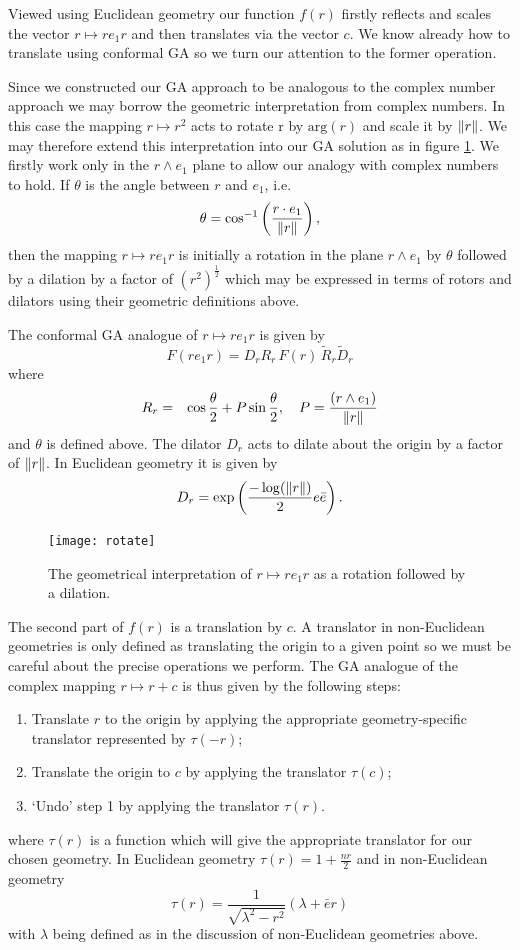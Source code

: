 \begin{enumarate}
Viewed using Euclidean geometry our function $f(r)$ firstly reflects and
scales the vector $r \mapsto re_1r$ and then translates via the vector $c$. We
know already how to translate using conformal GA so we turn our attention to
the former operation.

Since we constructed our GA approach to be analogous to the complex number approach we
may borrow the geometric interpretation from complex numbers. In this case the mapping 
$r \mapsto r^2$ acts to rotate r by $\mathrm{arg}(r)$ and scale it by
$\left\Vert r \right\Vert$. We may therefore extend this interpretation into our GA solution as in
figure \ref{fig:rotate}. We firstly work only in the $r \wedge e_1$ plane to allow
our analogy with complex numbers to hold. If $\theta$ is the angle between $r$ and
$e_1$, i.e.
\[
\theta = \cos^{-1}\left(\frac{r \cdot e_1}{\left\Vert r \right\Vert}\right),
\] 
then the mapping $r \mapsto re_1r$ is initially a rotation in the plane $r \wedge e_1$
by $\theta$ followed by a dilation by a factor of $(r^2)^\frac{1}{2}$ 
which may be expressed in terms of rotors and dilators using their geometric
definitions above.

\begin{definition}
The conformal GA analogue of $r \mapsto re_1r$ is given by
\[
F(re_1r) = D_r R_r\,F(r)\,\tilde{R}_r \tilde{D}_r
\]
where
\begin{eqnarray*}
R_r & = & \cos \frac{\theta}{2} + P \sin \frac{\theta}{2},
    \quad
P = \frac{(r \wedge e_1)}{\left\Vert r \right\Vert}
\end{eqnarray*}
and $\theta$ is defined above.
The dilator $D_r$ acts to dilate about the origin by a factor of
$\left\Vert r \right\Vert$. In Euclidean geometry it is given by
\[
D_r = \exp\left( \frac{-\log(\left\Vert r \right\Vert)}{2} e\bar{e} \right).
\]
\end{definition}

\begin{figure}
\centering
\texttt{[image: rotate]}
\caption{\label{fig:rotate}%
  The geometrical interpretation of $r \mapsto re_1r$ as a rotation followed by a dilation.
}
\end{figure}

The second part of $f(r)$ is a translation by $c$. A translator in non-Euclidean
geometries is only defined as translating the origin to a given point so we must be
careful about the precise operations we perform. The GA analogue of the
complex mapping $r \mapsto r + c$ is thus given by the following steps:
\begin{enumerate}
\item Translate $r$ to the origin by applying the appropriate geometry-specific translator represented by $\tau(-r)$;
\item Translate the origin to $c$ by applying the translator $\tau(c)$;
\item `Undo' step 1 by applying the translator $\tau(r)$.
\end{enumerate}
where $\tau(r)$ is a function which will give the appropriate translator for our 
chosen geometry. In Euclidean geometry $\tau(r) = 1 + \frac{nr}{2}$ and in
non-Euclidean geometry
\[
\tau(r) = \frac{1}{\sqrt{\lambda^2 - r^2}}(\lambda + \bar{e}r)
\]
with $\lambda$ being defined as in the discussion of non-Euclidean geometries above.


\end{enumarate}
